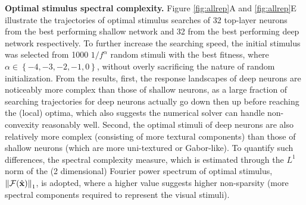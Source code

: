 \documentclass[10pt,twocolumn,letterpaper]{article}
\begin{document}
{\bf Optimal stimulus spectral complexity.} Figure \ref{fig:allrep}A and \ref{fig:allrep}E illustrate the trajectories of optimal stimulus searches of 32 top-layer neurons from the best performing shallow network and 32 from the best performing deep network respectively.
To further increase the searching speed, the initial stimulus {was} selected from 1000 ${1}/{f^{\alpha}}$ random stimuli with the best fitness, where $\alpha \in \left\lbrace -4,-3,-2,-1,0 \right\rbrace$, without overly sacrificing the nature of random initialization.
From the results, first, the response landscapes of deep neurons are noticeably more complex than those of shallow neurons, as a large fraction of searching trajectories for deep neurons actually go down then up before reaching the (local) optima, which also suggests the numerical solver can handle non-convexity reasonably well.
Second, the optimal stimuli of deep neurons are also relatively more complex (\ie consisting of more textural components) than those of shallow neurons (which are more uni-textured or Gabor-like).
To quantify such differences, the spectral complexity measure, which is estimated through the $L^{1}$ norm of the (2 dimensional) Fourier power spectrum of optimal stimulus, \ie $\left\| \mathcal{F}(\hat{\bf{x}}) \right\|_{1}$, is adopted, where a higher value suggests higher non-sparsity (\ie more spectral components required to represent the visual stimuli).


\newcommand{\defbaseline}{Given a single inner-product neuron $f({\bf{x}}) = {\bf{w}}^{T}{\bf{x}}$ and $\left\| \bf{x} \right\| = 1$, we have $\hat{\bf{x}} = \bf{w}$ and thus $f({\bf{x}}_{\delta}) = {\hat{\bf{x}}}^{T}{\bf{x}}_{\delta} = \cos(\delta)$ by definition.}
\end{document}
